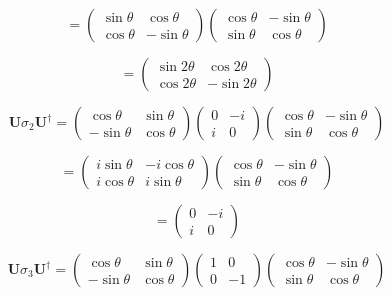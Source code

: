 \documentclass[12pt]{article}
\begin{document}
\[
    =
    \begin{pmatrix}
        \sin \theta & \cos \theta  \\
        \cos \theta & -\sin \theta
    \end{pmatrix}
    \begin{pmatrix}
        \cos \theta & -\sin \theta \\
        \sin \theta & \cos \theta
    \end{pmatrix}
\]

\[
    =
    \begin{pmatrix}
        \sin 2\theta  & \cos 2 \theta \\
        \cos 2 \theta & -\sin 2\theta
    \end{pmatrix}
\]

\[
    \mathbf{U}\sigma_2\mathbf{U^\dagger} =
    \begin{pmatrix}
        \cos \theta  & \sin \theta \\
        -\sin \theta & \cos \theta
    \end{pmatrix}
    \begin{pmatrix}
        0 & -i \\
        i & 0
    \end{pmatrix}
    \begin{pmatrix}
        \cos \theta & -\sin \theta \\
        \sin \theta & \cos \theta
    \end{pmatrix}
\]

\[
    =
    \begin{pmatrix}
        i\sin \theta & -i\cos \theta \\
        i\cos \theta & i\sin \theta
    \end{pmatrix}
    \begin{pmatrix}
        \cos \theta & -\sin \theta \\
        \sin \theta & \cos \theta
    \end{pmatrix}
\]

\[
    =
    \begin{pmatrix}
        0 & -i \\
        i & 0
    \end{pmatrix}
\]

\[
    \mathbf{U}\sigma_3\mathbf{U^\dagger} =
    \begin{pmatrix}
        \cos \theta  & \sin \theta \\
        -\sin \theta & \cos \theta
    \end{pmatrix}
    \begin{pmatrix}
        1 & 0  \\
        0 & -1
    \end{pmatrix}
    \begin{pmatrix}
        \cos \theta & -\sin \theta \\
        \sin \theta & \cos \theta
    \end{pmatrix}
\]
\end{document}
